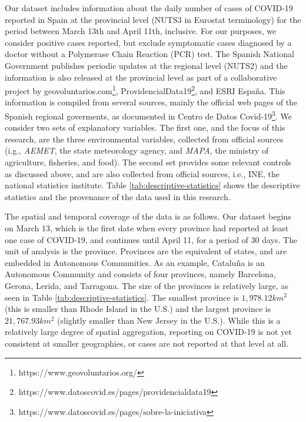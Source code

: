 \documentclass[]{elsarticle} %
\begin{document}
Our dataset includes information about the daily number of cases of
COVID-19 reported in Spain at the provincial level (NUTS3 in Eurostat
terminology) for the period between March 13th and April 11th,
inclusive. For our purposes, we consider positive cases reported, but
exclude symptomatic cases diagnosed by a doctor without a Polymerase
Chain Reaction (PCR) test. The Spanish National Government publishes
periodic updates at the regional level (NUTS2) and the information is
also released at the provincial level as part of a collaborative project
by geovoluntarios.com\footnote{https://www.geovoluntarios.org/},
ProvidencialData19\footnote{https://www.datoscovid.es/pages/providencialdata19},
and ESRI España. This information is compiled from several sources,
mainly the official web pages of the Spanish regional goverments, as
documented in Centro de Datos
Covid-19\footnote{https://www.datoscovid.es/pages/sobre-la-iniciativa}.
We consider two sets of explanatory variables. The first one, and the
focus of this research, are the three environmental variables, collected
from official sources (i.g., \emph{AEMET}, the state meteorology agency,
and \emph{MAPA}, the ministry of agriculture, fisheries, and food). The
second set provides some relevant controls as discussed above, and are
also collected from official sources, i.e., INE, the national statistics
institute. Table \ref{tab:descriptive-statistics} shows the descriptive
statistics and the provenance of the data used in this research.

The spatial and temporal coverage of the data is as follows. Our dataset
begins on March 13, which is the first date when every province had
reported at least one case of COVID-19, and continues until April 11,
for a period of 30 days. The unit of analysis is the province. Provinces
are the equivalent of states, and are embedded in Autonomous
Communities. As an example, Cataluña is an Autonomous Community and
consists of four provinces, namely Barcelona, Gerona, Lerida, and
Tarragona. The size of the provinces is relatively large, as seen in
Table \ref{tab:descriptive-statistics}. The smallest province is
\(1,978.12km^2\) (this is smaller than Rhode Island in the U.S.) and the
largest province is \(21,767.93km^2\) (slightly smaller than New Jersey
in the U.S.). While this is a relatively large degree of spatial
aggregation, reporting on COVID-19 is not yet consistent at smaller
geographies, or cases are not reported at that level at all.
\end{document}
